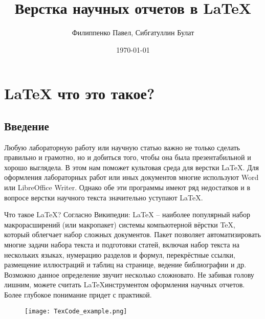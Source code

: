 

\author{Филиппенко Павел, Сибгатуллин Булат}
\title{Верстка научных отчетов в \LaTeX{}}
\date{\today}


    \maketitle
    \thispagestyle{empty}

    \newpage
    \tableofcontents{} %
    \newpage

    \section{\LaTeX{} что это такое?}

    \subsection{Введение}

    Любую лабораторную работу или научную статью важно не только сделать правильно и грамотно, но и добиться того, чтобы она была презентабильной и хорошо выглядела. В этом нам поможет культовая среда для верстки \LaTeX{}.
    Для оформления лабораторных работ или иных документов многие используют Word или LibreOffice Writer. Однако обе эти программы имеют ряд недостатков и в вопросе верстки научного текста значительно уступают \LaTeX{}.

    Что такое \LaTeX{}?  
    Согласно Википедии: \LaTeX{} -- наиболее популярный набор макрорасширений (или макропакет) системы компьютерной вёрстки \TeX, который облегчает набор сложных документов. Пакет позволяет автоматизировать многие задачи набора текста и подготовки статей, включая набор текста на нескольких языках, нумерацию разделов и формул, перекрёстные ссылки, размещение иллюстраций и таблиц на странице, ведение библиографии и др.
    Возможно данное определение звучит несколько сложновато. Не забивая голову лишним, можете считать \LaTeX инструментом оформления научных отчетов. Более глубокое понимание придет с практикой.

    \begin{figure}[h!]
        \centering
        \texttt{[image: TexCode\_example.png]}
        \caption{}
    \end{figure}

    \newpage

